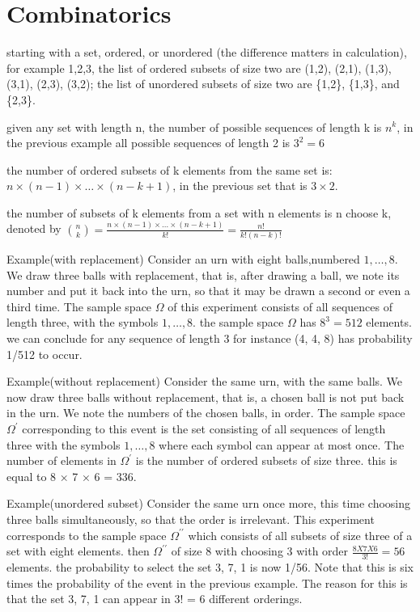 \documentclass[4apaper,12pt]{book}
\begin{document}
  \section{Combinatorics}
  \begin{description}
  \item starting with a set, ordered, or unordered (the difference matters in calculation), for example {1,2,3}, the list of ordered subsets of size two are (1,2), (2,1), (1,3), (3,1), (2,3), (3,2); the list of unordered subsets of size two are \{1,2\}, \{1,3\}, and \{2,3\}.
  \item given any set with length n, the number of possible sequences of length k is $n^k$, in the previous example all possible sequences of length 2 is $3^2=6$
  \item the number of ordered subsets of k elements from the same set is: $n \times (n-1) \times \dots \times (n-k+1)$, in the previous set that is $3 \times 2$.
  \item the number of subsets of k elements from a set with n elements is n choose k, denoted by $\binom{n}{k} = \frac{n \times (n-1) \times \dots \times (n-k+1)}{k!}=\frac{n!}{k!(n-k)!}$
  \item Example(with replacement) Consider an urn with eight balls,numbered $1,\dots, 8$. We draw three balls with replacement, that is, after drawing a ball, we note its number and put it back into the urn, so that it may be drawn a second or even a third time. The sample space $\Omega$ of this experiment consists of all sequences of length three, with the symbols $1,\dots, 8$. the sample space $\Omega$ has $8^3 = 512$ elements. we can conclude for any sequence of length 3 for instance (4, 4, 8) has probability 1/512 to occur.
  \item Example(without replacement) Consider the same urn, with the same balls. We now draw three balls without replacement, that is, a chosen ball is not put back in the urn. We note the numbers of the chosen balls, in order. The sample space $\Omega^{\prime}$ corresponding to this event is the set consisting of all sequences of length three with the symbols $1, \dots , 8$ where each symbol can appear at most once. The number of elements in $\Omega^{\prime}$ is the number of ordered subsets of size three. this is equal to 8 × 7 × 6 = 336.
  \item Example(unordered subset) Consider the same urn once more, this time choosing three balls simultaneously, so that the order is irrelevant. This experiment corresponds to the sample space $\Omega^{\prime\prime}$ which consists of all subsets of size  three of a set with eight elements. then $\Omega^{\prime\prime}$ of size 8 with choosing 3 with order $\frac{8X7X6}{3!} = 56$ elements. the probability to select the set {3, 7, 1} is now 1/56. Note that this is six times the probability of the event in the previous example. The reason for this is that the set {3, 7, 1} can appear in 3! = 6 different orderings.
  \end{description}
\end{document}
